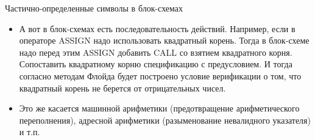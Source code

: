 \documentclass[hyperref={unicode=true}]{beamer}
\begin{document}
    \begin{frame}{Частично-определенные символы в блок-схемах}
    \begin{itemize}
    \item
    А вот в блок-схемах есть последовательность действий.
    Например, если в операторе ASSIGN надо использовать
    квадратный корень. Тогда в блок-схеме надо перед этим ASSIGN
    добавить CALL со взятием квадратного корня. Сопоставить
    квадратному корню спецификацию с предусловием. И тогда
    согласно методам Флойда будет построено условие верификации
    о том, что квадратный корень не берется от отрицательных чисел.
    \item
    Это же касается машинной арифметики (предотвращение арифметического
            переполнения), адресной арифметики (разыменование
                невалидного указателя) и т.п.
    \end{itemize}
    \end{frame}
\end{document}
